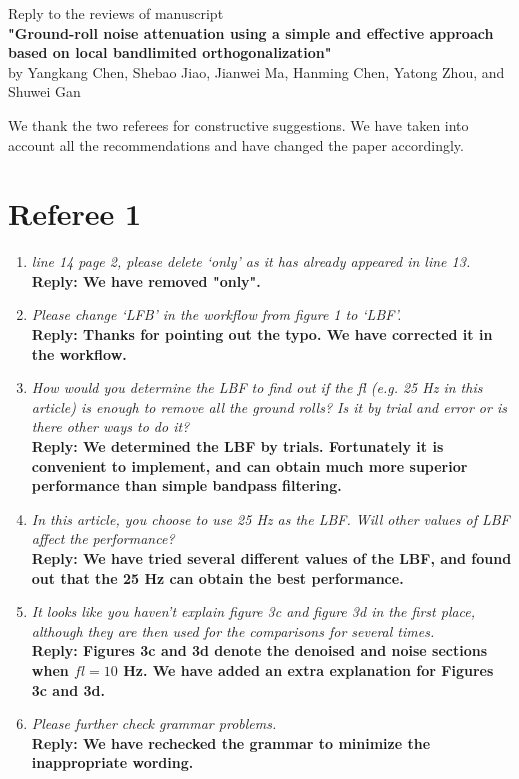 \begin{center}
Reply to the reviews  of manuscript \\
\textbf{"Ground-roll noise attenuation using a simple and effective approach based on local bandlimited orthogonalization"} \\
by Yangkang Chen, Shebao Jiao, Jianwei Ma, Hanming Chen, Yatong Zhou, and Shuwei Gan
\end{center}

We thank the two referees for constructive suggestions. We have taken into account all the recommendations and have changed the paper accordingly. 

\section{Referee 1}
\begin{enumerate}
\item \emph{line 14 page 2, please delete ‘only’ as it has already appeared in line 13.}\\
\textbf{Reply: We have removed "only".}

\item \emph{Please change ‘LFB’ in the workflow from figure 1 to ‘LBF’.}\\
\textbf{Reply: Thanks for pointing out the typo. We have corrected it in the workflow.}

\item \emph{How would you determine the LBF to find out if the fl (e.g. 25 Hz in this article) is enough to
remove all the ground rolls? Is it by trial and error or is there other ways to do it?}\\
\textbf{Reply: We determined the LBF by trials. Fortunately it is convenient to implement, and can obtain much more superior performance than simple bandpass filtering.}

\item \emph{In this article, you choose to use 25 Hz as the LBF. Will other values of LBF affect the
performance?}\\
\textbf{Reply: We have tried several different values of the LBF, and found out that the 25 Hz can obtain the best performance.}

\item \emph{It looks like you haven’t explain figure 3c and figure 3d in the first place, although they are then
used for the comparisons for several times.}\\
\textbf{Reply: Figures 3c and 3d denote the denoised and noise sections when $fl=10$ Hz. We have added an extra explanation for Figures 3c and 3d.}

\item \emph{Please further check grammar problems.}\\
\textbf{Reply: We have rechecked the grammar to minimize the inappropriate wording.}
\end{enumerate}



